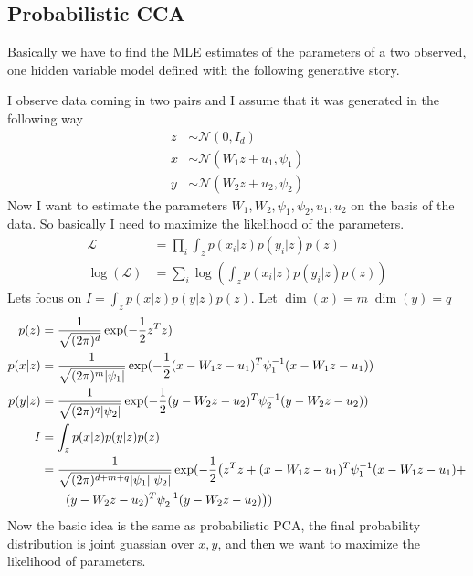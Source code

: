 \documentclass[11pt]{article}
\renewcommand{\det}[1]{|#1|}
\newcommand{\mf}{-\frac{1}{2}}
\begin{document}
\subsection{Probabilistic CCA}
Basically we have to find the MLE estimates of the parameters of a two
observed, one hidden variable model defined with the following
generative story. 

I observe data coming in two pairs and I assume that it was generated
in the following way
\begin{align}
  z &\sim \mathcal{N}(0, I_d)\\
  x &\sim \mathcal{N}(W_1z + u_1, \psi_1)\\
  y &\sim \mathcal{N}(W_2z + u_2, \psi_2)
\end{align}
Now I want to estimate the parameters $W_1, W_2, \psi_1, \psi_2,
u_1, u_2$ on the basis of the data. So basically I need to
maximize the likelihood of the parameters.
\begin{align}
  \mathcal{L} &= \prod_i \int_z p(x_i|z) p(y_i|z) p(z)\\
  \log(\mathcal{L}) &= \sum_i \log(\int_z p(x_i|z) p(y_i|z) p(z))
\end{align}
Lets focus on $I = \int_z p(x|z) p(y|z) p(z)$. Let $\dim(x)=m\; \dim(y)=q$
\begin{align}
  p(z)&= \frac{1}{\sqrt{(2\pi)^d}} \exp(\mf z^Tz)\\
  p(x|z)&= \frac{1}{\sqrt{(2\pi)^m\det{\psi_1}}}  \exp( \mf (x-W_1z-u_1)^T\psi_1^{-1}(x-W_1z-u_1))\\
  p(y|z)&= \frac{1}{\sqrt{(2\pi)^q\det{\psi_2}}}  \exp( \mf (y-W_2z-u_2)^T\psi_2^{-1}(y-W_2z-u_2))\\
  I &= \int_z p(x|z) p(y|z) p(z)\\
  &= \frac{1}{\sqrt{(2\pi)^{d+m+q} \det{\psi_1}\det{\psi_2} }}\exp(\mf
  \big( z^Tz + (x-W_1z-u_1)^T\psi_1^{-1}(x-W_1z-u_1) + \notag\\
  & \qquad (y-W_2z-u_2)^T\psi_2^{-1}(y-W_2z-u_2) \big) ) 
\end{align}
Now the basic idea is the same as probabilistic PCA, the final
probability distribution is joint guassian over $x, y$, and then we
want to maximize the likelihood of parameters.
\end{document}

